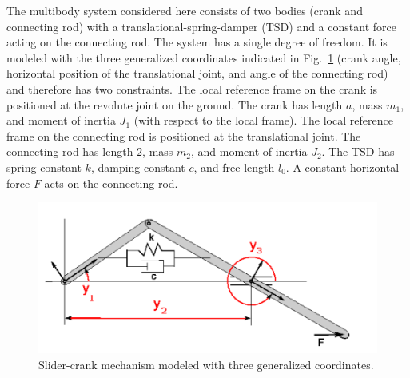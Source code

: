 The multibody system considered here consists of two bodies (crank and connecting
rod) with a translational-spring-damper (TSD) and a constant force acting on the
connecting rod.  The system has a single degree of freedom. It is modeled with the
three generalized coordinates indicated in Fig.~\ref{f:sl_crank}
(crank angle, horizontal position of the translational joint, and angle of the connecting rod)
and therefore has two constraints. The local reference frame on the crank is positioned at 
the revolute joint on the ground.  The crank has length $a$, mass $m_1$, and moment of 
inertia $J_1$ (with respect to the local frame).  The local reference frame on the connecting 
rod is positioned at the translational joint.  The connecting rod has length $2$, mass $m_2$, 
and moment of inertia $J_2$.
The TSD has spring constant $k$, damping constant $c$, and free length $l_0$.
A constant horizontal force $F$ acts on the connecting rod.
\begin{figure}[h]
  {\centerline{\includegraphics[width=\textwidth]{figs_slcrank/slider_crank}}}
  \caption{Slider-crank mechanism modeled with three generalized coordinates.}
  \label{f:sl_crank}
\end{figure}

